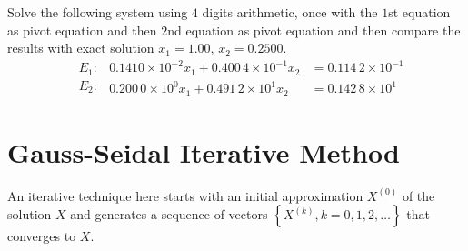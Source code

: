 \documentclass[12pt,class=book,crop=false]{standalone}
\begin{document}
\begin{prob}
    Solve the following system using \( 4 \) digits arithmetic, once with the \( 1 \)st equation as pivot equation and then \( 2 \)nd equation as pivot equation and then compare the results with exact solution \( x_1=1.00,\, x_2=0.2500  \).
    \[
        \left.\begin{aligned}
            & E_1: \\
            & E_2:
        \end{aligned}\right.
        \left.\begin{aligned}
            0.1410\times 10^{-2}x_1+0.400\,4\times 10^{-1}x_2& =0.114\,2\times 10^{-1}     \\
            0.200\,0\times 10^{0}x_1+0.491\,2\times 10^{1}x_2& =0.142\,8\times 10^{1}
        \end{aligned} \right.
    \]
\end{prob}
\section{Gauss-Seidal Iterative Method}
An iterative technique here starts with an initial approximation \( X^{(0)} \) of the solution \( X \) and generates a sequence of vectors \( \left\{X^{(k)},k=0,1,2,\dots\right\} \) that converges to \( X \).
\end{document}
